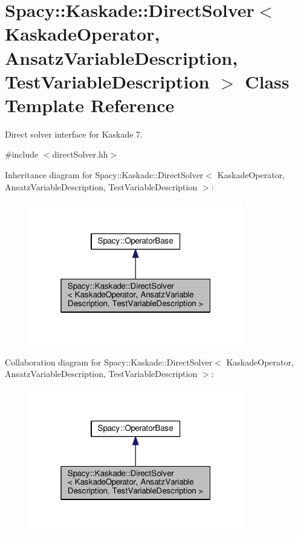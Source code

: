 \hypertarget{classSpacy_1_1Kaskade_1_1DirectSolver}{}\section{Spacy\+:\+:Kaskade\+:\+:Direct\+Solver$<$ Kaskade\+Operator, Ansatz\+Variable\+Description, Test\+Variable\+Description $>$ Class Template Reference}
\label{classSpacy_1_1Kaskade_1_1DirectSolver}


Direct solver interface for Kaskade 7.  




{\ttfamily \#include $<$direct\+Solver.\+hh$>$}



Inheritance diagram for Spacy\+:\+:Kaskade\+:\+:Direct\+Solver$<$ Kaskade\+Operator, Ansatz\+Variable\+Description, Test\+Variable\+Description $>$\+:
\nopagebreak
\begin{figure}[H]
\begin{center}
\leavevmode
\includegraphics[width=265pt]{classSpacy_1_1Kaskade_1_1DirectSolver__inherit__graph}
\end{center}
\end{figure}


Collaboration diagram for Spacy\+:\+:Kaskade\+:\+:Direct\+Solver$<$ Kaskade\+Operator, Ansatz\+Variable\+Description, Test\+Variable\+Description $>$\+:
\nopagebreak
\begin{figure}[H]
\begin{center}
\leavevmode
\includegraphics[width=265pt]{classSpacy_1_1Kaskade_1_1DirectSolver__coll__graph}
\end{center}
\end{figure}
